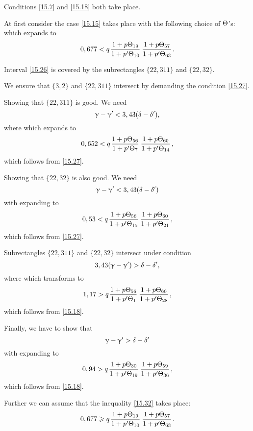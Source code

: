 Conditions \ref{15.7} and \ref{15.18} both take place.

At first consider the case \ref{15.15} takes place with the following choice of $\Theta$'s:
which expands to
\begin{equation}\label{15.27}
	0,677 < q \up{19}{10} \up{57}{63}.
\end{equation}

Interval \ref{15.26} is covered by the subrectangles $\{22, 311\}$ and $\{22, 32\}$.

We ensure that $\{3, 2\}$ and $\{22, 311\}$ intersect by demanding the condition \ref{15.27}.

Showing that $\{22, 311\}$ is good. We need
\begin{equation}
	\upgamma - \upgamma' < 3,43(\delta - \delta'),
\end{equation}
where
which expands to
\begin{equation}\label{15.28}
	0,652 < q \up{56}{7} \up{60}{14},
\end{equation}
which follows from \ref{15.27}.

Showing that $\{22, 32\}$ is also good. We need
\begin{equation*}
	\upgamma - \upgamma' < 3,43 (\delta - \delta')
\end{equation*}
with
expanding to
\begin{equation}\label{15.29}
	0,53 < q \up{56}{15} \up{60}{21},
\end{equation}
which follows from \ref{15.27}.

Subrectangles $\{22, 311\}$ and $\{22, 32\}$ intersect under condition
\begin{equation}
	3,43 (\upgamma - \upgamma') > \delta - \delta',
\end{equation}
where
which transforms to
\begin{equation}\label{15.30}
	1,17 > q \up{56}{1} \up{60}{28},
\end{equation}
which follows from \ref{15.18}.

Finally, we have to show that
\begin{equation*}
	\upgamma - \upgamma' > \delta - \delta'
\end{equation*}
with
expanding to
\begin{equation}\label{15.31}
	0,94 > q \up{30}{19} \up{59}{36},
\end{equation}
which follows from \ref{15.18}.

Further we can assume that the inequality \ref{15.32} takes place:
\begin{equation}\label{15.32}
	0,677 \geqslant q \up{19}{10} \up{57}{63}.
\end{equation}


